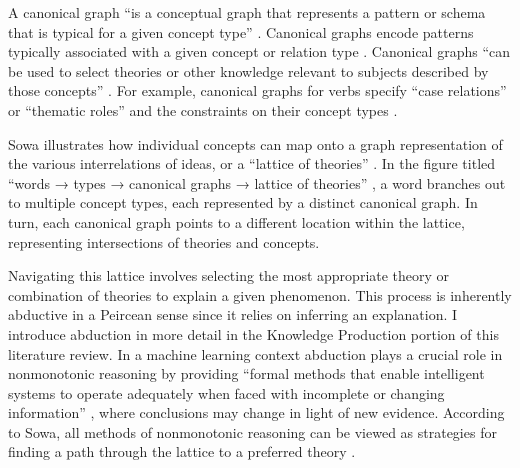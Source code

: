A canonical graph ``is a conceptual graph that represents a pattern or schema that is typical for a given concept type” \citep[p. 53]{sowa_semantics_2013}. Canonical graphs encode patterns typically associated with a given concept or relation type \citep[p. 53]{sowa_semantics_2013}. Canonical graphs “can be used to select theories or other knowledge relevant to subjects described by those concepts” \citep[p. 53]{sowa_semantics_2013}. For example, canonical graphs for verbs specify “case relations” or “thematic roles” and the constraints on their concept types \citep[p. 53]{sowa_semantics_2013}. 

Sowa illustrates how individual concepts can map onto a graph representation of the various interrelations of ideas, or a ``lattice of theories” \citep[p. 12]{sowa_language_2007}. In the figure titled “words → types → canonical graphs → lattice of theories” \citep[p. 12]{sowa_language_2007}, a word branches out to multiple concept types, each represented by a distinct canonical graph. In turn, each canonical graph points to a different location within the lattice, representing intersections of theories and concepts.


Navigating this lattice involves selecting the most appropriate theory or combination of theories to explain a given phenomenon. This process is inherently abductive in a Peircean sense since it relies on inferring an explanation. I introduce abduction in more detail in the Knowledge Production portion of this literature review. In a machine learning context abduction plays a crucial role in nonmonotonic reasoning by providing ``formal methods that enable intelligent systems to operate adequately when faced with incomplete or changing information” \citep{antoniou_nonmonotonic_1997}, where conclusions may change in light of new evidence. According to Sowa, all methods of nonmonotonic reasoning can be viewed as strategies for finding a path through the lattice to a preferred theory \citep[p. 60]{john_f_sowa_dynamic_2007}. 


